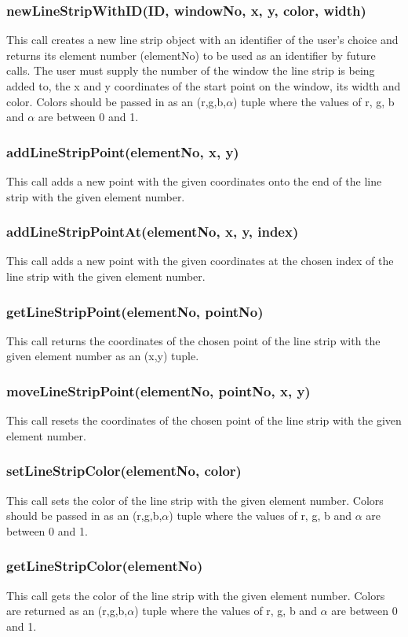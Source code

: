\documentclass{acm_proc_article-sp}
\begin{document}
\subsubsection{newLineStripWithID(ID, windowNo, x, y, color, width)}
This call creates a new line strip object with an identifier of the user's choice and returns its element number (elementNo) to be used as an identifier by future calls. The user must supply the number of the window the line strip is being added to, the x and y coordinates of the start point on the window, its width and color. Colors should be passed in as an (r,g,b,$\alpha$) tuple where the values of r, g, b and $\alpha$ are between 0 and 1.
\subsubsection{addLineStripPoint(elementNo, x, y)}
This call adds a new point with the given coordinates onto the end of the line strip with the given element number.
\subsubsection{addLineStripPointAt(elementNo, x, y, index)}
This call adds a new point with the given coordinates at the chosen index of the line strip with the given element number.
\subsubsection{getLineStripPoint(elementNo, pointNo)}
This call returns the coordinates of the chosen point of the line strip with the given element number as an (x,y) tuple.
\subsubsection{moveLineStripPoint(elementNo, pointNo, x, y)}
This call resets the coordinates of the chosen point of the line strip with the given element number.
\subsubsection{setLineStripColor(elementNo, color)}
This call sets the color of the line strip with the given element number. Colors should be passed in as an (r,g,b,$\alpha$) tuple where the values of r, g, b and $\alpha$ are between 0 and 1.
\subsubsection{getLineStripColor(elementNo)}
This call gets the color of the line strip with the given element number. Colors are returned as an (r,g,b,$\alpha$) tuple where the values of r, g, b and $\alpha$ are between 0 and 1.
\end{document}
